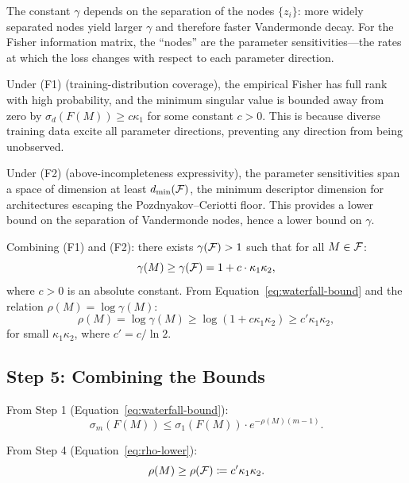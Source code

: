 The constant $\gamma$ depends on the separation of the nodes $\{z_i\}$: more widely separated nodes yield larger $\gamma$ and therefore faster Vandermonde decay. For the Fisher information matrix, the ``nodes'' are the parameter sensitivities---the rates at which the loss changes with respect to each parameter direction.

Under (F1) (training-distribution coverage), the empirical Fisher has full rank with high probability, and the minimum singular value is bounded away from zero by $\sigma_d(F(M)) \geq c \kappa_1$ for some constant $c > 0$. This is because diverse training data excite all parameter directions, preventing any direction from being unobserved.

Under (F2) (above-incompleteness expressivity), the parameter sensitivities span a space of dimension at least $d_{\text{min}}(\mathcal{F})$, the minimum descriptor dimension for architectures escaping the Pozdnyakov--Ceriotti floor. This provides a lower bound on the separation of Vandermonde nodes, hence a lower bound on $\gamma$.

Combining (F1) and (F2): there exists $\gamma(\mathcal{F}) > 1$ such that for all $M \in \mathcal{F}$:
\begin{equation}\label{eq:gamma-bound}
    \gamma(M) \geq \gamma(\mathcal{F}) = 1 + c \cdot \kappa_1 \kappa_2,
\end{equation}
where $c > 0$ is an absolute constant. From Equation~\eqref{eq:waterfall-bound} and the relation $\rho(M) = \log \gamma(M)$:
\begin{equation}\label{eq:rho-lower}
    \rho(M) = \log \gamma(M) \geq \log(1 + c \kappa_1 \kappa_2) \geq c' \kappa_1 \kappa_2,
\end{equation}
for small $\kappa_1 \kappa_2$, where $c' = c / \ln 2$.

\subsection{Step 5: Combining the Bounds}

From Step 1 (Equation~\eqref{eq:waterfall-bound}):
\begin{equation}
    \sigma_m(F(M)) \leq \sigma_1(F(M)) \cdot e^{-\rho(M)(m-1)}.
\end{equation}

From Step 4 (Equation~\eqref{eq:rho-lower}):
\begin{equation}
    \rho(M) \geq \rho(\mathcal{F}) \coloneqq c' \kappa_1 \kappa_2.
\end{equation}

